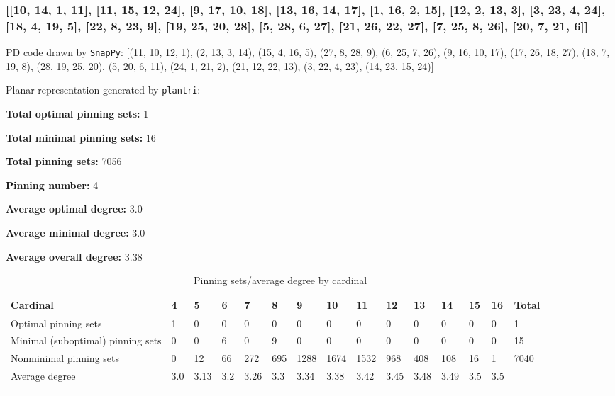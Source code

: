 \documentclass{article}%
\begin{document}
\newpage

\subsubsection{[[10, 14, 1, 11], [11, 15, 12, 24], [9, 17, 10, 18], [13, 16, 14, 17], [1, 16, 2, 15], [12, 2, 13, 3], [3, 23, 4, 24], [18, 4, 19, 5], [22, 8, 23, 9], [19, 25, 20, 28], [5, 28, 6, 27], [21, 26, 22, 27], [7, 25, 8, 26], [20, 7, 21, 6]]}

{\small\noindent PD code drawn by \texttt{SnapPy}: [(11, 10, 12, 1), (2, 13, 3, 14), (15, 4, 16, 5), (27, 8, 28, 9), (6, 25, 7, 26), (9, 16, 10, 17), (17, 26, 18, 27), (18, 7, 19, 8), (28, 19, 25, 20), (5, 20, 6, 11), (24, 1, 21, 2), (21, 12, 22, 13), (3, 22, 4, 23), (14, 23, 15, 24)]}

{\small\noindent Planar representation generated by \texttt{plantri}: -}

\begin{multicols}{2}
{\normalsize \noindent\textbf{Total optimal pinning sets:} 1

\noindent\textbf{Total minimal pinning sets:} 16

\noindent\textbf{Total pinning sets:} 7056

\noindent\textbf{Pinning number:} 4

}
\columnbreak

{\normalsize \noindent\textbf{Average optimal degree:} 3.0

\noindent\textbf{Average minimal degree:} 3.0

\noindent\textbf{Average overall degree:} 3.38

}
\end{multicols}

\begin{table}[ht]
	\caption{Pinning sets/average degree by cardinal}
	\centering
	\renewcommand{\arraystretch}{1.5}
	\begin{tabularx}{\textwidth}{lXXXXXXXXXXXXXXX}
		\toprule
			Cardinal & 4 & 5 & 6 & 7 & 8 & 9 & 10 & 11 & 12 & 13 & 14 & 15 & 16 & Total\\
			\hline
			Optimal pinning sets & 1 & 0 & 0 & 0 & 0 & 0 & 0 & 0 & 0 & 0 & 0 & 0 & 0 & 1 \\
			Minimal (suboptimal) pinning sets & 0 & 0 & 6 & 0 & 9 & 0 & 0 & 0 & 0 & 0 & 0 & 0 & 0 & 15 \\
			Nonminimal pinning sets & 0 & 12 & 66 & 272 & 695 & 1288 & 1674 & 1532 & 968 & 408 & 108 & 16 & 1 & 7040 \\
			Average degree & 3.0 & 3.13 & 3.2 & 3.26 & 3.3 & 3.34 & 3.38 & 3.42 & 3.45 & 3.48 & 3.49 & 3.5 & 3.5 &  \\
		\bottomrule \\ 
	\end{tabularx}
\end{table}
\end{document}
